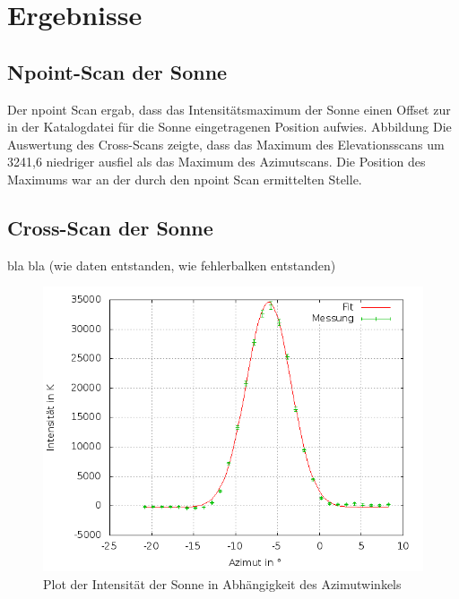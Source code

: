 \section{Ergebnisse}
\subsection{Npoint-Scan der Sonne}
Der npoint Scan ergab, dass das Intensitätsmaximum der Sonne einen Offset zur in der Katalogdatei für die Sonne eingetragenen Position aufwies. Abbildung %
Die Auswertung des Cross-Scans zeigte, dass das Maximum des Elevationsscans um 3241,6 niedriger ausfiel als das Maximum des Azimutscans. Die Position des Maximums war an der durch den npoint Scan ermittelten Stelle.

\subsection{Cross-Scan der Sonne}
bla bla (wie daten entstanden, wie fehlerbalken entstanden)

\begin{figure}
		\includegraphics[width=.9\textwidth]{images/sun_azimut}
\caption{ Plot der Intensität der Sonne in Abhängigkeit des Azimutwinkels }
\label{fig:sunaz}
\end{figure}

